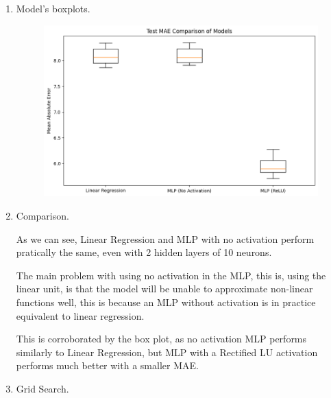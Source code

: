 \documentclass{article}
\begin{document}
\begin{enumerate}[leftmargin=\labelsep,resume]
\item  Model's boxplots.

\begin{figure}[H]
  \centering
  \includegraphics[width=0.5\linewidth]{img/5_boxplot.png}
\end{figure}

\item Comparison.

As we can see, Linear Regression and MLP with no activation perform pratically the same, even with 2 hidden layers of 10 neurons.

The main problem with using no activation in the MLP, this is, using the linear unit, is that the model will be unable to approximate non-linear functions well, this is because an MLP without activation is in practice equivalent to linear regression.

This is corroborated by the box plot, as no activation MLP performs similarly to Linear Regression, but MLP with a Rectified LU activation performs much better with a smaller MAE.

\item Grid Search.


\end{enumerate}
\end{document}
